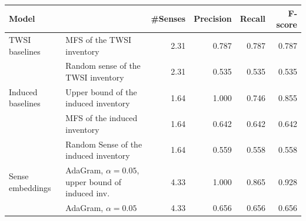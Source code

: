 \documentclass[11pt]{article}
\begin{document}
\begin{table}[t!]
\scriptsize

\centering


\centering
\begin{tabular}{llrrrr}
\toprule

\bf Model & & \bf \#Senses & \bf Precision & \bf Recall & \bf F-score  \\
\toprule
TWSI baselines & MFS of the TWSI inventory   & 2.31  & 0.787 &	0.787&	0.787  \\
& Random sense of the TWSI inventory & 2.31 & 0.535 & 0.535 &	0.535  \\
\midrule
Induced baselines & Upper bound of the induced inventory  & 1.64    & 1.000  & 0.746 &  0.855 \\
& MFS of the induced inventory  & 1.64 & 0.642 & 0.642  & 0.642  \\
& Random Sense of the induced inventory  & 1.64 & 0.559 &	0.558	& 0.558   \\
\midrule
Sense embeddings & AdaGram, $\alpha = 0.05$, upper bound of induced inv. & 4.33 & 1.000 & 0.865 & 0.928 \\
& AdaGram, $\alpha = 0.05$ & 4.33 & 0.656 & 0.656 & 0.656 \\ 


\toprule


\end{tabular}
\end{table}
\end{document}
